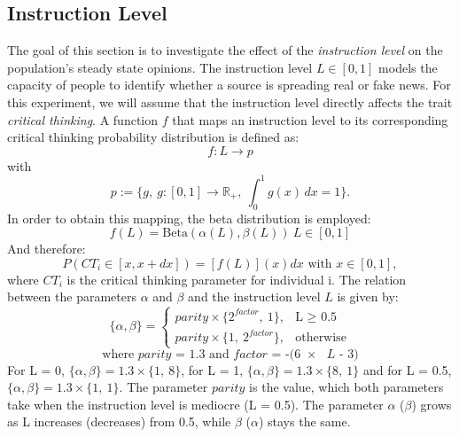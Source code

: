 \subsection{Instruction Level}
\label{sec:Instr_Level}
The goal of this section is to investigate the effect of the \emph{instruction level} on the population's steady state opinions. The instruction level $L \in [0,1]$ models the capacity of people to identify whether a source is spreading real or fake news. For this experiment, we will assume that the instruction level directly affects the trait \emph{critical thinking}. A function $f$  that maps an instruction level to its corresponding critical thinking probability distribution is defined as:
$$
f: L \to p 
$$
with
$$
p:= \{g,\ g: [0,1] \to \mathbb{R}_+,\ \int_{0}^{1} g(x) \,dx = 1\}.
$$
In order to obtain this mapping, the beta distribution is employed: 
$$
f(L) = \text{Beta}(\alpha(L), \beta(L))\ L \in [0,1]
$$
And therefore:
$$
P(CT_i\in[x,x+dx]) = [f(L)](x) dx \text{ with } x\in [0,1],
$$
where $CT_i$ is the critical thinking parameter for individual i. 
The relation between the parameters $\alpha$ and $\beta$ and the instruction level $L$ is given by: 
$$
\{\alpha, \beta\} = 
\begin{cases}
parity \times \{2^{factor},\ 1\},& \text{L $\geq$ 0.5}\\
parity \times \{1,\ 2^{factor}\},& \text{otherwise}
\end{cases}
$$
$$ 
\text{where }
\text{$parity$ = 1.3 and $factor$ = -(6 $\times$ $L$ - 3)}
$$
For L = 0, $\{\alpha, \beta\} = 1.3\times\{1,\ 8\}$, for L = 1, $\{\alpha, \beta\} = 1.3\times\{8,\ 1\}$ and for L = 0.5, $\{\alpha, \beta\} = 1.3\times\{1,\ 1\}$. The parameter $parity$ is the value, which both parameters take when the instruction level is mediocre (L = 0.5). The parameter $\alpha$ ($\beta$) grows as L increases (decreases) from 0.5, while $\beta$ ($\alpha$) stays the same. 

